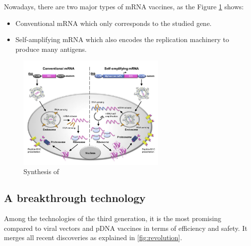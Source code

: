 \documentclass{article}
\begin{document}
            Nowadays, there are two major types of mRNA vaccines, as the Figure \ref{fig:mRNAtypesnext} shows:
            \begin{itemize}
                \item Conventional mRNA which only corresponds to the studied gene.
                \item Self-amplifying mRNA which also encodes the replication machinery to produce many antigens.
            \end{itemize}
            
            \begin{figure}
                \centering
                \includegraphics[width=0.65\textwidth]{imgs/mRNA_action.JPG}
                \caption{Synthesis of \autocite{MRNATransformativeTechnology}}
                \label{fig:mRNAtypesnext}
            \end{figure}


     
        \subsection{A breakthrough technology}

            Among the technologies of the third generation, it is the most promising compared to viral vectors and pDNA vaccines in terms of efficiency and safety.
            It merges all recent discoveries as explained in \ref{fig:revolution}.
            
\end{document}
